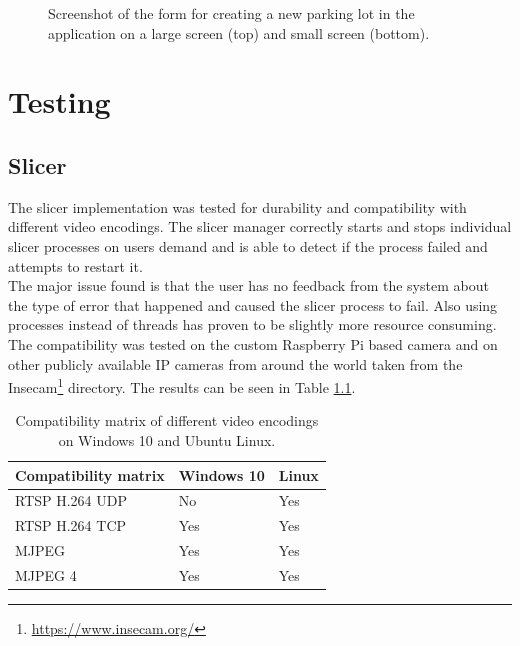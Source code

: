 \documentclass[thesis=M,english]{FITthesis}[2019/03/06]
\begin{document}
\begin{figure}[ht!]
	\caption{Screenshot of the form for creating a new parking lot in the application on a large screen (top) and small screen (bottom).}
	\label{label:ss_new_both}
\end{figure}

\chapter{Testing}
\section{Slicer}
The slicer implementation was tested for durability and compatibility with different video encodings. The slicer manager correctly starts and stops individual slicer processes on users demand and is able to detect if the process failed and attempts to restart it. \\


The major issue found is that the user has no feedback from the system about the type of error that happened and caused the slicer process to fail. Also using processes instead of threads has proven to be slightly more resource consuming.\\

The compatibility was tested on the custom Raspberry Pi based camera and on other publicly available IP cameras from around the world taken from the Insecam\footnote{\url{https://www.insecam.org/}} directory. The results can be seen in Table \ref{slicer_compatibility}.




\begin{table}[ht!]
\centering
\caption{Compatibility matrix of different video encodings on Windows 10 and Ubuntu Linux.}
\begin{tabular}{|l|l|l|}
\hline
\textbf{Compatibility matrix} & \textbf{Windows 10} & \textbf{Linux} \\ \hline
RTSP H.264 UDP                & No                  & Yes            \\ \hline
RTSP H.264 TCP                & Yes                 & Yes            \\ \hline
MJPEG                         & Yes                 & Yes            \\ \hline
MJPEG 4                       & Yes                 & Yes            \\ \hline
\end{tabular}
\label{slicer_compatibility}
\end{table}
\end{document}
